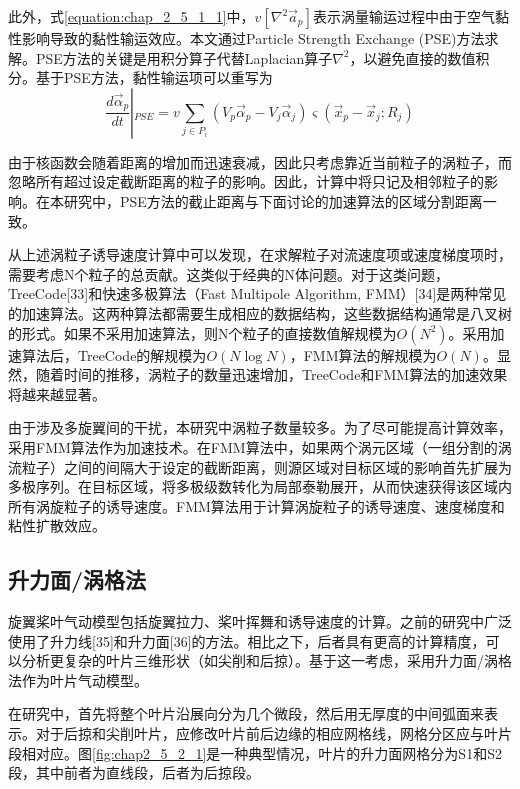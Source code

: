 此外，式\ref{equation:chap_2_5_1_1}中，$v\left[ {{\nabla ^2}{{\vec a}_p}} \right]$表示涡量输运过程中由于空气黏性影响导致的黏性输运效应。本文通过Particle Strength Exchange (PSE)方法求解。PSE方法的关键是用积分算子代替Laplacian算子${\nabla ^2}$，以避免直接的数值积分。基于PSE方法，黏性输运项可以重写为
\begin{equation}
    \frac{{d{{\vec \alpha }_p}}}{{dt}}\left| {_{PSE} = v\sum\limits_{j \in {P_i}} {\left( {{V_p}{{\vec \alpha }_p} - {V_j}{{\vec \alpha }_j}} \right)\varsigma \left( {{{\vec x}_p} - {{\vec x}_j};{R_j}} \right)} } \right.
\end{equation}

由于核函数会随着距离的增加而迅速衰减，因此只考虑靠近当前粒子的涡粒子，而忽略所有超过设定截断距离的粒子的影响。因此，计算中将只记及相邻粒子的影响。在本研究中，PSE方法的截止距离与下面讨论的加速算法的区域分割距离一致。

从上述涡粒子诱导速度计算中可以发现，在求解粒子对流速度项或速度梯度项时，需要考虑N个粒子的总贡献。这类似于经典的N体问题。对于这类问题，TreeCode[33]和快速多极算法（Fast Multipole Algorithm, FMM）[34]是两种常见的加速算法。这两种算法都需要生成相应的数据结构，这些数据结构通常是八叉树的形式。如果不采用加速算法，则N个粒子的直接数值解规模为$O\left( {{N^2}} \right)$。采用加速算法后，TreeCode的解规模为$O\left( {N\log N} \right)$，FMM算法的解规模为$O\left( N \right)$。显然，随着时间的推移，涡粒子的数量迅速增加，TreeCode和FMM算法的加速效果将越来越显著。

由于涉及多旋翼间的干扰，本研究中涡粒子数量较多。为了尽可能提高计算效率，采用FMM算法作为加速技术。在FMM算法中，如果两个涡元区域（一组分割的涡流粒子）之间的间隔大于设定的截断距离，则源区域对目标区域的影响首先扩展为多极序列。在目标区域，将多极级数转化为局部泰勒展开，从而快速获得该区域内所有涡旋粒子的诱导速度。FMM算法用于计算涡旋粒子的诱导速度、速度梯度和粘性扩散效应。
\subsection{升力面/涡格法}
旋翼桨叶气动模型包括旋翼拉力、桨叶挥舞和诱导速度的计算。之前的研究中广泛使用了升力线[35]和升力面[36]的方法。相比之下，后者具有更高的计算精度，可以分析更复杂的叶片三维形状（如尖削和后掠）。基于这一考虑，采用升力面/涡格法作为叶片气动模型。

在研究中，首先将整个叶片沿展向分为几个微段，然后用无厚度的中间弧面来表示。对于后掠和尖削叶片，应修改叶片前后边缘的相应网格线，网格分区应与叶片段相对应。图\ref{fig:chap2_5_2_1}是一种典型情况，叶片的升力面网格分为S1和S2段，其中前者为直线段，后者为后掠段。

